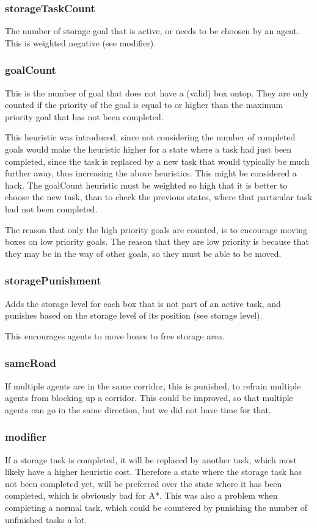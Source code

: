 \documentclass[letterpaper]{article}
\begin{document}
\subsubsection{storageTaskCount}
The number of storage goal that is active, or needs to be choosen by an agent.
This is weighted negative (see modifier).

\subsubsection{goalCount}
This is the number of goal that does not have a (valid) box ontop. They are only
counted if the priority of the goal is equal to or higher than the maximum priority
goal that has not been completed.

This heuristic was introduced, since not considering the number of completed goals
would make the heuristic higher for a state where a task had just been completed,
since the task is replaced by a new task that would typically be much further away,
thus increasing the above heuristics. This might be considered a hack. The goalCount
heuristic must be weighted so high that it is better to choose the new task, than to
check the previous states, where that particular task had not been completed.

The reason that only the high priority goals are counted, is to encourage moving
boxes on low priority goals. The reason that they are low priority is because that
they may be in the way of other goals, so they must be able to be moved.

\subsubsection{storagePunishment}
Adds the storage level for each box that is not part of an active task, and
punishes based on the storage level of its position (see storage level).

This encourages agents to move boxes to free storage area.

\subsubsection{sameRoad}
If multiple agents are in the same corridor, this is punished, to refrain multiple
agents from blocking up a corridor. This could be improved, so that multiple agents
can go in the same direction, but we did not have time for that.

\subsubsection{modifier}
If a storage task is completed, it will be replaced by another task, which most likely
have a higher heuristic cost. Therefore a state where the storage task has not been completed
yet, will be preferred over the state where it has been completed, which is obviously bad
for A*. This was also a problem when completing a normal task, which could be countered
by punishing the number of unfinished tasks a lot.
\end{document}
